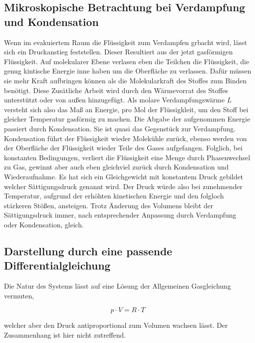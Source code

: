 \subsection{Mikroskopische Betrachtung bei Verdampfung und Kondensation}
Wenn im evakuiertem Raum die Flüssigkeit zum Verdampfen grbacht wird, lässt sich ein Druckanstieg feststellen.
Dieser Resultiert aus der jetzt gasförmigen Flüssigkeit. Auf molekularer Ebene verlasen eben die Teilchen die Flüssigkeit, die genug kintische Energie 
inne haben um die Oberfläche zu verlassen. Dafür müssen sie mehr Kraft aufbringen können als die Molekularkraft des Stoffes zum Binden benötigt.
Diese Zusätliche Arbeit wird durch den Wärmevorrat des Stoffes unterstützt oder von außen hinzugefügt.
Als molare Verdampfungswärme $L$ versteht sich also das Maß an Energie, pro Mol der Flüssigkleit, um den Stoff bei gleicher Temperatur gasförmig zu machen.
Die Abgabe der aufgenommen Energie passiert durch Kondensation. Sie ist quasi das Gegenstück zur Verdampfung.
Kondensation führt der Flüssigkeit wieder Molekühle zurück, ebenso werden von der Oberfläche der Flüssigkeit wieder Teile des Gases aufgefangen.
Folglich, bei konstanten Bedingungen, verliert die Flüssigkeit eine Menge durch Phasenwechsel zu Gas, gewinnt aber auch eben gleichviel 
zurück durch Kondensation und Wiederaufnahme. Es hat sich ein Gleichgewicht mit konstantem Druck gebildet welcher Sättigungsdruck genannt wird.
Der Druck würde also bei zunehmender Temperatur, aufgrund der erhöhten kinetischen Energie und den folgloch stärkeren Stößen, ansteigen.
Trotz Änderung des Volumens bleibt der Sättigungsdruck immer, nach entsprechender Anpassung durch Verdampfung oder Kondensation, gleich.

\subsection{Darstellung durch eine passende Differentialgleichung}
Die Natur des Systems lässt auf eine Lösung der Allgemeinen Gasgleichung vermuten,

\begin{equation}
    \label{eqn:gas}
    p \cdot V = R \cdot T
\end{equation}

welcher aber den Druck antiproportional zum Volumen wachsen lässt. Der Zusammenhang ist hier nicht zutreffend.

